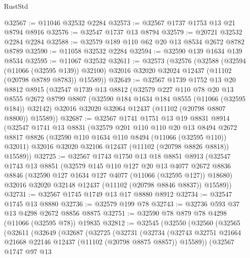 \begin{lexlean}{RustStd}
\begin{coremodule}
@32567 := @11046 @32532 @2284
@32573 := @32567 @1737 @1753 @13 @21 @8794 @8916
@32576 := @32547 @1737 @13 @8794
@32579 := @20721 @32532 @2284 @2284
@32588 := @32579 @189 @110 @62 @20 @13 @8534 @2672 @8782 @8789
@32590 := @11058 @32532 @2284
@32594 := @32590 @139 @1634 @139 @8534
@32595 := @11067 @32532
@32611 := @32573
    (@32576
      (@32588
        (@32594 (@11066 (@32595 @139)) @32100)
        @32016
        @32020
        @32024
        @12437
        (@11102 (@20798 @8789 @8783))
        @15589))
@32649 := @32567
    @1739
    @1752
    @13
    @20
    @8812
    @8915
    (@32547
      @1739
      @13
      @8812
      (@32579
        @227
        @110
        @78
        @20
        @13
        @8555
        @2672
        @8799
        @8807
        (@32590 @184 @1634 @184 @8555 (@11066 (@32595 @184)) @32142)
        @32016
        @32020
        @32064
        @12437
        (@11102 (@20798 @8807 @8800))
        @15589))
@32687 := @32567
    @1741
    @1751
    @13
    @19
    @8831
    @8914
    (@32547
      @1741
      @13
      @8831
      (@32579
        @201
        @110
        @110
        @20
        @13
        @8494
        @2672
        @8817
        @8826
        (@32590 @110 @1634 @110 @8494 (@11066 (@32595 @110)) @32011)
        @32016
        @32020
        @32106
        @12437
        (@11102 (@20798 @8826 @8818))
        @15589))
@32725 := @32567
    @1743
    @1750
    @13
    @18
    @8851
    @8913
    (@32547
      @1743
      @13
      @8851
      (@32579
        @145
        @110
        @127
        @20
        @13
        @4077
        @2672
        @8836
        @8846
        (@32590 @127 @1634 @127 @4077 (@11066 (@32595 @127)) @18680)
        @32016
        @32020
        @32148
        @12437
        (@11102 (@20798 @8846 @8837))
        @15589))
@32731 := @32567 @1745 @1749 @13 @17 @8880 @8912
@32734 := @32547 @1745 @13 @8880
@32736 := @32579 @199 @78
@32743 := @32736 @593 @37 @13 @4298 @2672 @8856 @8875
@32751 := @32590 @78 @879 @78 @4298 (@11066 (@32595 @78)) @19835
@32812 := @32545
    (@32550
      (@32560
        (@32565
          (@32611
            (@32649
              (@32687
                (@32725
                  (@32731
                    (@32734
                      (@32743
                        @32751
                        @21664
                        @21668
                        @22146
                        @12437
                        (@11102 (@20798 @8875 @8857))
                        @15589))
                    (@32567
                      @1747
                      @97
                      @13

\end{coremodule}
\end{lexlean}

